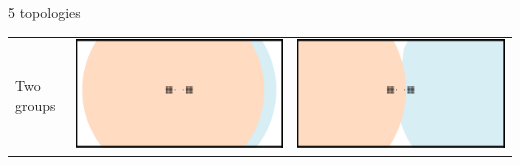 \documentclass[8pt, handout=show,notes=show]{beamer}
\begin{document}
\begin{frame}{5 topologies}
\begin{table}[h]
\begin{tabular}{lcc}
			Two groups&\includegraphics[width=\imgSize]{../images/5StaticEnv/environments/staticEnv3}&\includegraphics[width=\imgSize]{../images/5StaticEnv/environments/staticEnv4}\\
		\end{tabular}
	\label{tab:gt}

	\end{table}%
\end{frame} %
\end{document}
